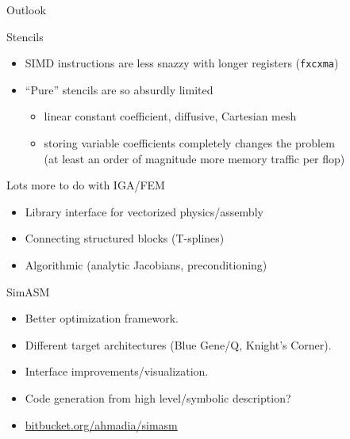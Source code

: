 \documentclass{beamer}
\begin{document}
\begin{frame}{Outlook}
  \begin{block}{Stencils}
    \begin{itemize}
    \item SIMD instructions are less snazzy with longer registers (\texttt{fxcxma})
    \item ``Pure'' stencils are so absurdly limited
      \begin{itemize}
      \item linear constant coefficient, diffusive, Cartesian mesh
      \item storing variable coefficients completely changes the problem \\
        (at least an order of magnitude more memory traffic per flop)
      \end{itemize}
    \end{itemize}
  \end{block}
  \begin{block}{Lots more to do with IGA/FEM}
    \begin{itemize}
    \item Library interface for vectorized physics/assembly
    \item Connecting structured blocks (T-splines)
    \item Algorithmic (analytic Jacobians, preconditioning)
    \end{itemize}
  \end{block}
  \begin{block}{SimASM}
    \begin{itemize}
    \item Better optimization framework.
    \item Different target architectures (\eg Blue Gene/Q, Knight's Corner).
    \item Interface improvements/visualization.
    \item Code generation from high level/symbolic description?
    \item \url{bitbucket.org/ahmadia/simasm}
    \end{itemize}
  \end{block}
\end{frame}



\end{document}

